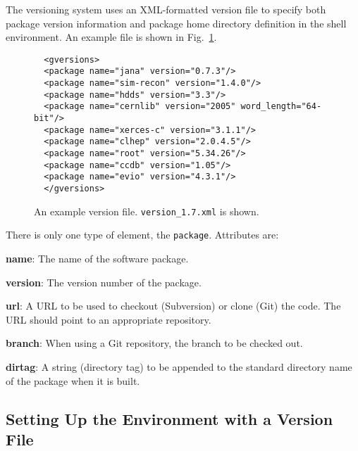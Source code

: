 \documentclass[12pt]{article}
\begin{document}
The versioning system uses an XML-formatted version file to specify
both package version information and package home directory definition
in the shell environment. An example file is shown in
Fig.~\ref{figure:version-xml}.

\begin{figure}
\begin{verbatim}
  <gversions>
  <package name="jana" version="0.7.3"/>
  <package name="sim-recon" version="1.4.0"/>
  <package name="hdds" version="3.3"/>
  <package name="cernlib" version="2005" word_length="64-bit"/>
  <package name="xerces-c" version="3.1.1"/>
  <package name="clhep" version="2.0.4.5"/>
  <package name="root" version="5.34.26"/>
  <package name="ccdb" version="1.05"/>
  <package name="evio" version="4.3.1"/>
  </gversions>
\end{verbatim}
\caption{An example version file. {\tt version\_1.7.xml} is shown.}\label{figure:version-xml}
\end{figure}

There is only one type of element, the {\tt package}. Attributes are:

\begin{description}
\item{\bf name}: The name of the software package.
\item{\bf version}: The version number of the package.
\item{\bf url}: A URL to be used to checkout (Subversion) or clone
  (Git) the code. The URL should point to an appropriate repository.
\item{\bf branch}: When using a Git repository, the branch to be
  checked out.
\item{\bf dirtag}: A string (directory tag) to be appended to the
  standard directory name of the package when it is built.
\end{description}

\subsection{Setting Up the Environment with a Version File}
\end{document}
